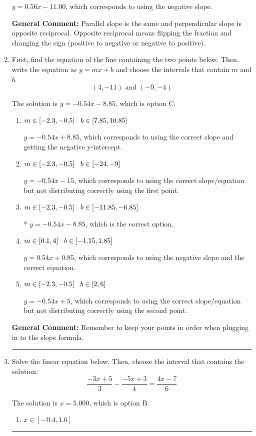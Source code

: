 \documentclass{extbook}[14pt]
\newcommand{\litem}[1]{\item #1

\rule{\textwidth}{0.4pt}}
\begin{document}
\begin{enumerate}
{\begin{enumerate}[label=\Alph*.]
 $y = 0.56x - 11.00$, which corresponds to using the negative slope.
\end{enumerate}

\textbf{General Comment:} Parallel slope is the same and perpendicular slope is opposite reciprocal. Opposite reciprocal means flipping the fraction and changing the sign (positive to negative or negative to positive).
}
\litem{
First, find the equation of the line containing the two points below. Then, write the equation as $ y=mx+b $ and choose the intervals that contain $m$ and $b$.
\[ (4, -11) \text{ and } (-9, -4) \]

The solution is \( y = -0.54x -8.85 \), which is option C.\begin{enumerate}[label=\Alph*.]
\item \( m \in [-2.3, -0.5] \hspace*{3mm} b \in [7.85, 10.85] \)

 $y = -0.54x + 8.85$, which corresponds to using the correct slope and getting the negative y-intercept.
\item \( m \in [-2.3, -0.5] \hspace*{3mm} b \in [-24, -9] \)

 $y = -0.54x -15$, which corresponds to using the correct slope/equation but not distributing correctly using the first point.
\item \( m \in [-2.3, -0.5] \hspace*{3mm} b \in [-11.85, -6.85] \)

* $y = -0.54x -8.85$, which is the correct option.
\item \( m \in [0.1, 4] \hspace*{3mm} b \in [-1.15, 1.85] \)

 $y = 0.54x + 0.85$, which corresponds to using the negative slope and the correct equation.
\item \( m \in [-2.3, -0.5] \hspace*{3mm} b \in [2, 6] \)

 $y = -0.54x + 5$, which corresponds to using the correct slope/equation but not distributing correctly using the second point.
\end{enumerate}

\textbf{General Comment:} Remember to keep your points in order when plugging in to the slope formula.
}
\litem{
Solve the linear equation below. Then, choose the interval that contains the solution.
\[ \frac{-3x + 5}{3} - \frac{-5x + 3}{4} = \frac{4x -7}{6} \]

The solution is \( x = 5.000 \), which is option B.\begin{enumerate}[label=\Alph*.]
\item \( x \in [-0.4, 1.6] \)


\end{enumerate}}
\end{enumerate}
\end{document}
